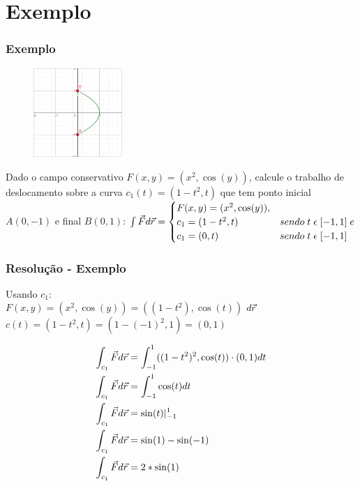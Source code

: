 \documentclass{beamer}
\def\vec{\mathaccent "017E\relax }
\begin{document}
\section{Exemplo}

\begin{frame}
    \frametitle{Exemplo} 

    \begin{figure} %
        \vspace{-35pt}
        \centering
        \caption{}
        \includegraphics[width=0.30\textwidth]{grafico-exemplo-1.png}
        \label{fig:grafico-exemplo1}
    \end{figure}

    Dado o campo conservativo $ F(x, y) = ( x^2, \cos(y) ) $, calcule o trabalho de deslocamento sobre a 
    curva $ c_1(t) = ( 1 - t^2, t ) $ que tem ponto inicial $ A(0, -1) $ e final $ B(0, 1) $:
    \hfill \break
    \hfill \break
    $
        \int{} \vec{F} d\vec{r} =  
        \begin{cases}
            F(x, y) = ( x^2, \cos(y) ),\\
            c_1 = ( 1 - t^2, t) &sendo \; t \; \epsilon \; [ -1, 1 ] \; e\\
            c_1 = ( 0, t)       &sendo \; t \; \epsilon \; [ -1, 1 ] \\
        \end{cases}
    $

\end{frame}

\begin{frame}
    \frametitle{Resolução - Exemplo} 
    Usando $ c_1 $: \\
    
    $ F(x, y) = ( x^2, \cos(y) ) = (( 1 - t^2 ), \cos(t) ) $
    \hfill \break
    $ d\vec{r} $
    \hfill \break
    $ c(t) = ( 1 - t^2, t ) = ( 1 - (-1)^2 , 1) = ( 0, 1 ) $
    \hfill \break

    \begin{align*}   
    \int_{c_1} \vec{F} d\vec{r} &= \int_{-1}^1 (( 1 - t^2)^2, \cos(t) ) \cdot ( 0, 1 ) dt \\
    \int_{c_1} \vec{F} d\vec{r} &= \int_{-1}^1 \cos(t) dt  \\
    \int_{c_1} \vec{F} d\vec{r} &= \sin(t)\vert_{-1}^{1} \\
    \int_{c_1} \vec{F} d\vec{r} &= \sin(1) - \sin(-1) \\
    \int_{c_1} \vec{F} d\vec{r} &= 2 * \sin(1) \\
    \end{align*}

\end{frame}
\end{document}
